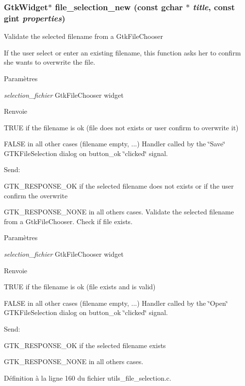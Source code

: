 \subsubsection[{file\_\-selection\_\-new}]{\setlength{\rightskip}{0pt plus 5cm}GtkWidget$\ast$ file\_\-selection\_\-new (const gchar $\ast$ {\em title}, \/  const gint {\em properties})}\label{utils__file__selection_8c_a28d01f93cf3b5c0f02cb506b15338c29}
Validate the selected filename from a GtkFileChooser

If the user select or enter an existing filename, this function asks her to confirm she wants to overwrite the file.


\begin{DoxyParams}{Paramètres}
\item[{\em selection\_\-fichier}]GtkFileChooser widget \end{DoxyParams}
\begin{DoxyReturn}{Renvoie}

\begin{DoxyItemize}
\item TRUE if the filename is ok (file does not exists or user confirm to overwrite it)
\item FALSE in all other cases (filename empty, ...) Handler called by the \char`\"{}Save\char`\"{} GTKFileSelection dialog on button\_\-ok \char`\"{}clicked\char`\"{} signal.
\end{DoxyItemize}
\end{DoxyReturn}
Send:
\begin{DoxyItemize}
\item GTK\_\-RESPONSE\_\-OK if the selected filename does not exists or if the user confirm the overwrite
\item GTK\_\-RESPONSE\_\-NONE in all others cases. Validate the selected filename from a GtkFileChooser. Check if file exists.
\end{DoxyItemize}


\begin{DoxyParams}{Paramètres}
\item[{\em selection\_\-fichier}]GtkFileChooser widget \end{DoxyParams}
\begin{DoxyReturn}{Renvoie}

\begin{DoxyItemize}
\item TRUE if the filename is ok (file exists and is valid)
\item FALSE in all other cases (filename empty, ...) Handler called by the \char`\"{}Open\char`\"{} GTKFileSelection dialog on button\_\-ok \char`\"{}clicked\char`\"{} signal.
\end{DoxyItemize}
\end{DoxyReturn}
Send:
\begin{DoxyItemize}
\item GTK\_\-RESPONSE\_\-OK if the selected filename exists
\item GTK\_\-RESPONSE\_\-NONE in all others cases. 
\end{DoxyItemize}

Définition à la ligne 160 du fichier utils\_\-file\_\-selection.c.

